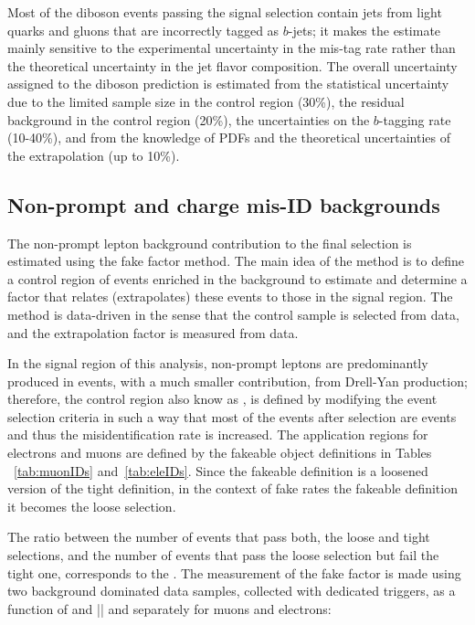 Most of the diboson events passing the signal selection contain jets from light quarks and gluons that are incorrectly tagged as $b$-jets; it makes the estimate mainly sensitive to the experimental uncertainty in the mis-tag rate rather than the theoretical uncertainty in the jet flavor composition. The overall uncertainty assigned to the diboson prediction is estimated from the statistical uncertainty due to the limited sample size in the control region (30\%), the residual background in the control region (20\%), the uncertainties on the $b$-tagging rate (10-40\%), and from the knowledge of PDFs and the theoretical uncertainties of the extrapolation (up to 10\%).

\subsection{Non-prompt and charge mis-ID backgrounds}\label{ssec:fake_rate}

The non-prompt lepton background contribution to the final selection is estimated using the fake factor method. The main idea of the method is to define a control region of events enriched in the background to estimate and determine a factor that relates (extrapolates) these events to those in the signal region. The method is data-driven in the sense that the control sample is selected from data, and the extrapolation factor is measured from data.

In the signal region of this analysis, non-prompt leptons are predominantly produced in \ttbar events, with a much smaller contribution, from Drell-Yan production; therefore, the control region also know as , is defined by modifying the event selection criteria in such a way that most of the events after selection are \ttbar events and thus the misidentification rate is increased. The application regions for electrons and muons are defined by the fakeable object definitions in Tables ~\ref{tab:muonIDs} and~\ref{tab:eleIDs}. Since the fakeable definition is a loosened version of the tight definition, in the context of fake rates the fakeable definition it becomes the loose selection. 

The ratio between the number of events that pass both, the loose and tight selections, and the number of events that pass the loose selection but fail the tight one, corresponds to the . The measurement of the fake factor is made using two background dominated data samples, collected with dedicated triggers, %
as a function of \pt and |\etac| and separately for muons and electrons:

